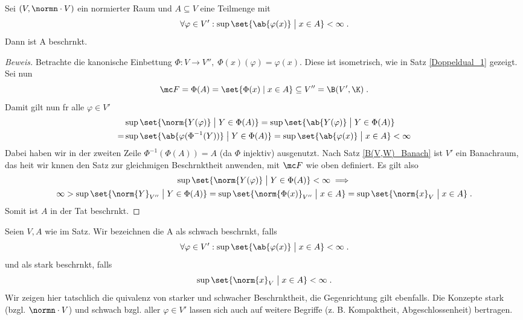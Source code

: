 \begin{theorem}
\begin{theorem}
	Sei \((V,\normn\cdot V)\) ein normierter Raum und \(A\subseteq V\) eine Teilmenge mit
	\[\forall \varphi \in V': \sup\set{\ab{\varphi(x)} \;\big\vert\; x\in A}<\infty\;.\]
	Dann ist A beschr\as nkt.
\end{theorem}
\begin{proof}[Beweis]
	Betrachte die kanonische Einbettung \(\Phi: V \to V'',\; \Phi(x)(\varphi) = \varphi(x)\). Diese ist isometrisch, wie in Satz \ref{Doppeldual_1} gezeigt. Sei nun 
	\[\mc F = \Phi(A) = \set{\Phi(x)\;\vert\;x \in A} \subseteq V'' = \B(V',\K)\;.\]
	Damit gilt nun  f\us r alle \(\varphi\in V'\)
	\begin{align*}
		& \sup \set{\norm{Y(\varphi)} \;\big\vert\; Y\in \Phi(A)} = \sup \set{\ab{Y(\varphi)} \;\big\vert\; Y\in \Phi(A)} \\
		 =& \sup \set{\ab{\varphi(\Phi^{-1}(Y))} \;\big\vert\; Y\in \Phi(A)} =  \sup \set{\ab{\varphi(x)} \;\big\vert\; x\in A} < \infty
	\end{align*}
	Dabei haben wir in der zweiten Zeile \(\Phi^{-1}(\Phi(A)) = A\) (da \(\Phi\) injektiv) ausgenutzt. Nach Satz \ref{B(V,W)_Banach} ist \(V'\) ein Banachraum, das hei\s t wir k\os nnen den Satz zur gleichm\as \s igen Beschr\as nktheit anwenden, mit \(\mc F \) wie oben definiert. Es gilt also
	\begin{multline*} 
		\sup \set{\norm{Y(\varphi)} \;\big\vert\; Y\in \Phi(A)} <\infty\implies  \\
		\infty > \sup \set{\norm{Y}_{V''} \;\big\vert\; Y\in \Phi(A)} =  \sup \set{\norm{\Phi(x)}_{V''} \;\big\vert\; x\in A} =  \sup \set{\norm{x}_V \;\big\vert\; x\in A}\;.
	\end{multline*}
	Somit ist \(A\) in der Tat beschr\as nkt.
\end{proof}
\begin{rem}
	Seien \(V, A\) wie im Satz. Wir bezeichnen die A als schwach beschr\as nkt, falls
	\[\forall \varphi \in V': \sup\set{\ab{\varphi(x)} \;\big\vert\; x\in A}<\infty\;.\]
	und als stark beschr\as nkt, falls
	\[\sup \set{\norm{x}_V \;\big\vert\; x\in A} < \infty\;.\]
	Wir zeigen hier tats\as chlich die \As quivalenz von starker und schwacher Beschr\as nktheit, die Gegenrichtung gilt ebenfalls. Die Konzepte stark (bzgl. \(\normn\cdot V\)) und schwach bzgl. aller \(\varphi\in V'\) lassen sich auch auf weitere Begriffe (z. B. Kompaktheit, Abgeschlossenheit) \us bertragen.
\end{rem}


\end{theorem}

